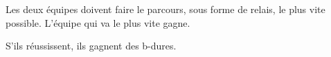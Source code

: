 \documentclass{grand-jeu}
\begin{document}
\begin{liste-materiel}
\end{liste-materiel}

\begin{regles}
Les deux équipes doivent faire le parcours, sous forme de relais, le plus vite possible. L’équipe qui va le plus vite gagne.

S’ils réussissent, ils gagnent des b-dures.
\end{regles}

\begin{imaginaire}

\end{imaginaire}

\begin{moments-stop}
\end{moments-stop}
\end{document}
